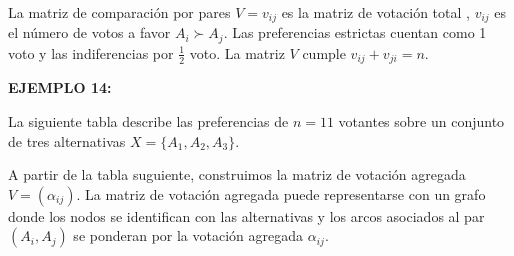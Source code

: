 \documentclass[a5paper,doc,10pt,noapacite]{apa6}
\begin{document}
{{La matriz de comparación por pares \(V = v_{ij}\) es la matriz de votación total \cite{Levin-1995}, \(v_{ij}\) es el número de votos a favor \(A_i \succ A_j\). 
Las preferencias estrictas cuentan como 1 voto y las indiferencias por \(\frac{1}{2}\) voto. La matriz \(V\) cumple \(v_{ij} + v_{ji} = n \).

\vspace{1\baselineskip}
\textbf{EJEMPLO 14:} 

\vspace{1\baselineskip}
La siguiente tabla describe las preferencias de \(n = 11\) votantes sobre un conjunto de tres alternativas \(X = \{A_1, A_2, A_3\}\).

\vspace{1\baselineskip}
A partir de la tabla suguiente, construimos la matriz de votación agregada \(V = (\alpha_{ij})\). La matriz de votación agregada puede representarse con un grafo donde los nodos se identifican con las alternativas y los arcos asociados al par \((A_i, A_j)\) se ponderan por la votación agregada \(\alpha_{ij}\). 


%
%
\begin{figure}[H]
\begin{floatrow}
	\fontsize{7}{11}\selectfont
	\captionsetup{justification=centering, labelfont=footnotesize, font=footnotesize}
\end{floatrow}
\end{figure}


}}
\end{document}
